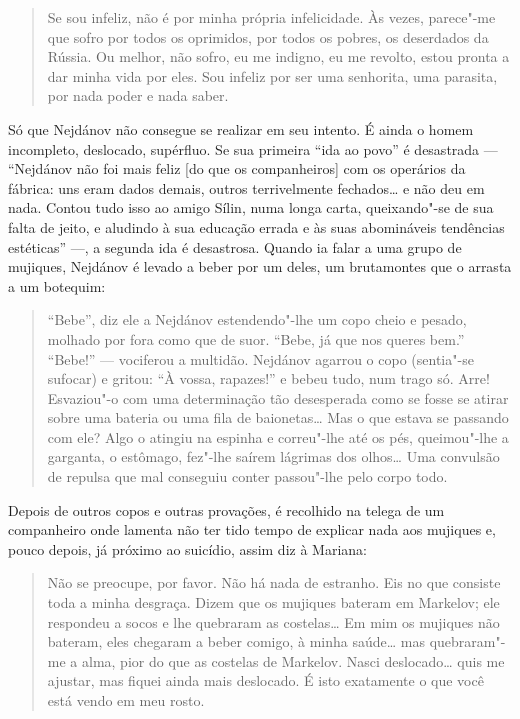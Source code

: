 \begin{quotation}
Se sou infeliz, não é por minha própria infelicidade. Às vezes, parece"-me que sofro por todos os oprimidos, por todos os pobres, os deserdados da Rússia. Ou melhor, não sofro, eu me indigno, eu me revolto, estou pronta a dar minha vida por eles. Sou infeliz por ser uma senhorita, uma parasita, por nada poder e nada saber.
\end{quotation}

Só que Nejdánov não consegue se realizar em seu intento. É ainda o homem incompleto, deslocado, supérfluo. Se sua primeira ``ida ao povo'' é desastrada --- ``Nejdánov não foi mais feliz [do que os companheiros] com os operários da fábrica: uns eram dados demais, outros terrivelmente fechados\ldots{} e não deu em nada. Contou tudo isso ao amigo Sílin, numa longa carta, queixando"-se de sua falta de jeito, e aludindo à sua educação errada e às suas abomináveis tendências estéticas'' ---, a segunda ida é desastrosa. Quando ia falar a uma grupo de mujiques, Nejdánov é levado a beber por um deles, um brutamontes que o arrasta a um botequim:

\begin{quotation}
``Bebe'', diz ele a Nejdánov estendendo"-lhe um copo cheio e pesado, molhado por fora como que de suor. ``Bebe, já que nos queres bem.'' ``Bebe!'' --- vociferou a multidão. Nejdánov agarrou o copo (sentia"-se sufocar) e gritou: ``À vossa, rapazes!'' e bebeu tudo, num trago só. Arre! Esvaziou"-o com uma determinação tão desesperada como se fosse se atirar sobre uma bateria ou uma fila de baionetas\ldots{} Mas o que estava se passando com ele? Algo o atingiu na espinha e correu"-lhe até os pés, queimou"-lhe a
garganta, o estômago, fez"-lhe saírem lágrimas dos olhos\ldots{} Uma convulsão de repulsa que mal conseguiu conter passou"-lhe pelo corpo todo.
\end{quotation}

Depois de outros copos e outras provações, é recolhido na telega de um companheiro onde lamenta não ter tido tempo de explicar nada aos mujiques e, pouco depois, já próximo ao suicídio, assim diz à Mariana:

\begin{quotation}
Não se preocupe, por favor. Não há nada de estranho. Eis no que consiste toda a minha desgraça. Dizem que os mujiques bateram em Markelov; ele respondeu a socos e lhe quebraram as costelas\ldots{} Em mim os mujiques não bateram, eles chegaram a beber comigo, à minha saúde\ldots{} mas quebraram"-me a alma, pior do que as costelas de Markelov. Nasci deslocado\ldots{} quis me
ajustar, mas fiquei ainda mais deslocado. É isto exatamente o que você está vendo em meu rosto.
\end{quotation}

